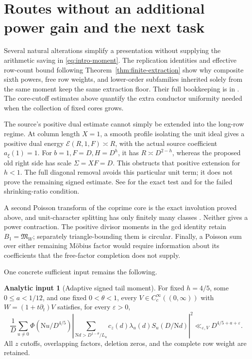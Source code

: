 \documentclass[11pt]{article}
\numberwithin{equation}{section}
\theoremstyle{definition}
\newtheorem{assumption}[theorem]{Analytic input}
\theoremstyle{remark}
\newcommand{\N}{\mathrm N}
\newcommand{\Mfrak}{\mathfrak M}
\newcommand{\eps}{\varepsilon}
\begin{document}
\section{Routes without an additional power gain and the next task}
\label{sec:limits}

Several natural alterations simplify a presentation without supplying
the arithmetic saving in \eqref{eq:intro-moment}.
The replication identities and effective row-count bound following
Theorem~\ref{thm:finite-extraction} show why composite sixth powers,
free row weights, and lower-order subfamilies inherited solely from
the same moment keep the same extraction floor. Their full
bookkeeping is in \cite{N5}.
The core-cutoff estimates above quantify the extra conductor
uniformity needed when the collection of fixed cores grows.

The source's positive dual estimate cannot simply be extended into
the long-row regime. At column length \(X=1\), a smooth profile
isolating the unit ideal gives a positive dual energy
\(\mathcal E(R,1,F)\asymp R\), with the actual source coefficient
\(a_\xi(1)=1\).
For \(b=1,F=D,H=D^h\), it has \(R\asymp D^{2-h}\),
whereas the proposed old right side has scale \(\Sigma=XF=D\).
This obstructs that positive extension for \(h<1\).
The full diagonal removal avoids this particular unit term;
it does not prove the remaining signed estimate.
See \cite{N2} for the exact test and \cite{N1} for the failed
shrinking-ratio condition.

A second Poisson transform of the coprime core is the exact involution
proved above, and unit-character splitting has only finitely many
classes \cite{N3}. Neither gives a power contraction.
The positive divisor moments in the gcd identity retain
\(B_1=\Mfrak_W\); separately triangle-bounding them is circular.
Finally, a Poisson sum over either remaining M\"obius factor would
require information about its coefficients that the free-factor
completion does not supply.

One concrete sufficient input remains the following.

\begin{assumption}[Adaptive signed tail moment]\label{input:open-tail}
For fixed \(h=4/5\), some \(0\le a<1/12\), and one fixed
\(0<\theta<1\), every \(V\in C_c^\infty((0,\infty))\) with
\(W=(1+t\partial_t)V\) satisfies, for every \(\eps>0\),
\[
 \frac1D\sum_{u\ne0}\Phi(\N u/D^{4/5})
 \left|\sum_{\N d>D^{1-\theta}/L_u}
     c_z(d)\lambda_u(d)S_u(D/\N d)\right|^2
       \ll_{\eps,V}D^{4/5+a+\eps}.
\]
All \(z\) cutoffs, overlapping factors, deletion zeros, and the
complete row weight are retained.
\end{assumption}
\end{document}
